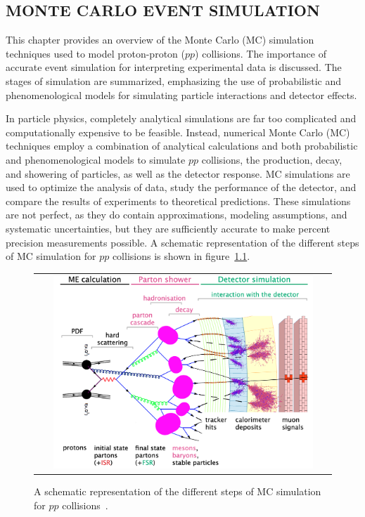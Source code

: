 \begin{refsection}

\chapter{MONTE CARLO EVENT SIMULATION}
\label{Monte_Carlo_Event_Simulation}

\begin{cabstract}
This chapter provides an overview of the Monte Carlo (MC) simulation techniques used to model proton-proton ($pp$) collisions. 
The importance of accurate event simulation for interpreting experimental data is discussed. 
The stages of simulation are summarized, emphasizing the use of probabilistic and phenomenological models for simulating particle interactions and detector effects. 
\end{cabstract}

In particle physics, completely analytical simulations are far too complicated and computationally expensive to be feasible.
Instead, numerical Monte Carlo (MC) techniques employ a combination of analytical calculations and both probabilistic and phenomenological models to simulate $pp$ collisions, the production, decay, and showering of particles, as well as the detector response.
MC simulations are used to optimize the analysis of data, study the performance of the detector, and compare the results of experiments to theoretical predictions.
These simulations are not perfect, as they do contain approximations, modeling assumptions, and systematic uncertainties, but they are sufficiently accurate to make percent precision measurements possible.
A schematic representation of the different steps of MC simulation for $pp$ collisions is shown in figure~\ref{MC_simulation}.
\begin{figure}[htb]
  \begin{center}
    \begin{tabular}{c}
        \includegraphics[width=0.9\textwidth]{fig_Event_Simulation/MC_simulation.png}
    \end{tabular}
    \caption{A schematic representation of the different steps of MC simulation for $pp$ collisions~\cite{Bartosik:222384}.
            }
    \label{MC_simulation}
  \end{center}
\end{figure}


\end{refsection}
